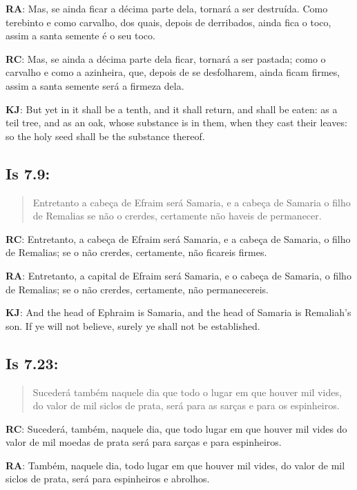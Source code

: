\textbf{RA}: Mas, se ainda ficar a décima parte dela, tornará a ser destruída. Como terebinto e como carvalho, dos quais, depois de derribados, ainda fica o toco, assim a santa semente é o seu toco.

\textbf{RC}: Mas, se ainda a décima parte dela ficar, tornará a ser pastada; como o carvalho e como a azinheira, que, depois de se desfolharem, ainda ficam firmes, assim a santa semente será a firmeza dela.

\textbf{KJ}: But yet in it shall be a tenth, and it shall return, and shall be eaten: as a teil tree, and as an oak, whose substance is in them, when they cast their leaves: so the holy seed shall be the substance thereof.

\subsection*{Is 7.9:} 
 \begin{quote}
  \small
 Entretanto a cabeça de Efraim será Samaria, e a cabeça de Samaria o filho de Remalias\uwave{;} se não o crerdes, certamente não haveis de permanecer.
\end{quote}

\textbf{RC}: Entretanto, a cabeça de Efraim será Samaria, e a cabeça de Samaria, o filho de Remalias; se o não crerdes, certamente, não ficareis firmes.

\textbf{RA}: Entretanto, a capital de Efraim será Samaria, e o cabeça de Samaria, o filho de Remalias; se o não crerdes, certamente, não permanecereis.

\textbf{KJ}: And the head of Ephraim is Samaria, and the head of Samaria is Remaliah’s son. If ye will not believe, surely ye shall not be established.

\subsection*{Is 7.23:} 
 \begin{quote}
  \small
 Sucederá também naquele dia que todo o lugar\uwave{,} em que houver mil vides, do valor de mil siclos de prata, será para as sarças e para os espinheiros.
 \end{quote}

\textbf{RC}: Sucederá, também, naquele dia, que todo lugar em que houver mil vides do valor de mil moedas de prata será para sarças e para espinheiros.

\textbf{RA}: Também, naquele dia, todo lugar em que houver mil vides, do valor de mil siclos de prata, será para espinheiros e abrolhos.

